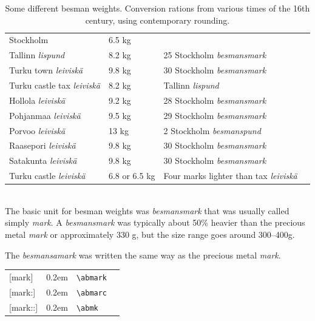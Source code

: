 \documentclass[a4paper]{article}
\newcommand{\samplefont}{\fontsize{16}{16}\abcursivefamily\spaceskip0.2em}
\newcommand{\sample}[1]{{\samplefont #1 \strut}}
\newcommand{\ltxncmd}[1]{\texttt{\textbackslash{}#1}}
\begin{document}
\begin{description}
\begin{table}
  \centering
  \begin{tabular}{llll}
    Stockholm & 6.5 kg \\
    Tallinn \emph{lispund}  & 8.2 kg &  25 Stockholm \emph{besmansmark} \\
    Turku town \emph{leiviskä} & 9.8 kg & 30 Stockholm    \emph{besmansmark} \\
    Turku castle tax \emph{leiviskä} & 8.2 kg & Tallinn \emph{lispund} \\
    Hollola \emph{leiviskä} & 9.2 kg  & 28 Stockholm \emph{besmansmark} \\
    Pohjanmaa \emph{leiviskä} & 9.5 kg & 29 Stockholm    \emph{besmansmark} \\
    Porvoo \emph{leiviskä} & 13 kg & 2 Stockholm \emph{besmanspund}   \\
    Raasepori \emph{leiviskä} & 9.8 kg & 30 Stockholm    \emph{besmansmark} \\
    Satakunta \emph{leiviskä} & 9.8 kg & 30 Stockholm  \emph{besmansmark} \\
    Turku castle \emph{leiviskä} & 6.8 or 6.5 kg & Four marks lighter
    than tax \emph{leiviskä} \\
  \end{tabular}
  \caption{Some different besman weights. Conversion rations from
    various times of the 16th century, using contemporary rounding.
  }
  \label{tab:lispunds}
\end{table}



\item [\sample{\abmark}, \sample{\abmarc} \emph{Besmansmark},
  \emph{mark}, \emph{naula}] \mbox{} \\
  The basic unit for besman weights was \emph{besmansmark} that was
  usually called simply \emph{mark}. A \emph{besmansmark} was
  typically about 50\% heavier than the precious metal \emph{mark} or
  approximately 330 g, but the size range goes around 300–400g.

  The \emph{besmansamark} was written the same way as the precious
  metal \emph{mark}.
    \begin{center}
    \begin{tabular}{llll}
      {}[mark]  & \sample{\abmark} & \ltxncmd{abmark} \\
      {}[mark:] & \sample{\abmarc} & \ltxncmd{abmarc}    \\
      {}[mark::] & \sample{\abmk} & \ltxncmd{abmk}  \\
    \end{tabular}
  \end{center}
\end{description}
\end{document}
